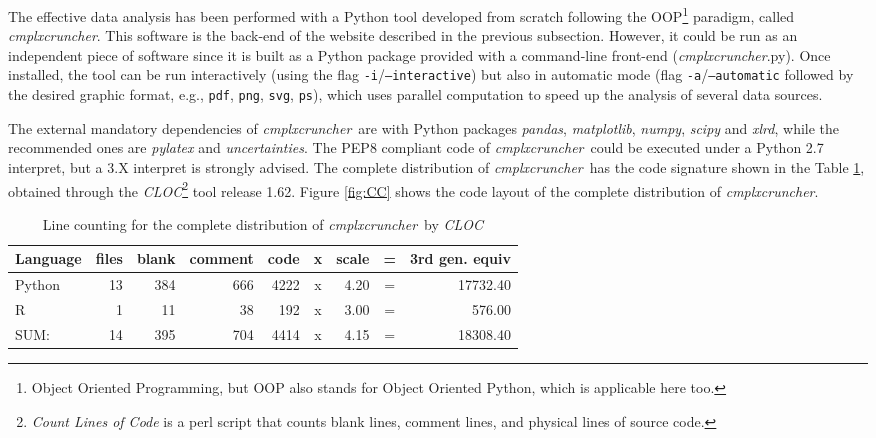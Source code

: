 \documentclass[12pt]{article}
\newcommand{\CC}[0]{\emph{cmplxcruncher}}
\begin{document}
The effective data analysis has been performed with a Python tool developed from scratch following the OOP\footnote{Object Oriented Programming, but OOP also stands for Object Oriented Python, which is applicable here too.} paradigm, called \CC. This software is the back-end of the website described in the previous subsection. However, it could be run as an independent piece of software since it is built as a Python package provided with a command-line front-end (\CC.py). Once installed, the tool can be run interactively (using the flag \texttt{-i}/\texttt{--interactive}) but also in automatic mode (flag \texttt{-a}/\texttt{--automatic} followed by the desired graphic format, e.g., \texttt{pdf}, \texttt{png}, \texttt{svg}, \texttt{ps}), which uses parallel computation to speed up the analysis of several data sources. 

The external mandatory dependencies of \CC\ are with Python packages \emph{pandas}, \emph{matplotlib}, \emph{numpy}, \emph{scipy} and \emph{xlrd}, while the recommended ones are \emph{pylatex} and \emph{uncertainties}. The PEP8 compliant code of \CC\ could be executed under a Python 2.7 interpret, but a 3.X interpret is strongly advised. The complete distribution of \CC\ has the code signature shown in the Table \ref{tab:cloc}, obtained through the \emph{CLOC}\footnote{\emph{Count Lines of Code} is a perl script that counts blank lines, comment lines, and physical lines of source code.} tool release 1.62. Figure \ref{fig:CC} shows the code layout of the complete distribution of \CC.

\begin{table}
  \begin{center}
    \begin{tabular}{lrrrrcrcr}
    \hline
	Language & files & blank & comment & code & x & scale & = & 3rd gen. equiv \\
	\hline
	Python & 13 & 384 & 666 & 4222 &x& 4.20 &=& 17732.40 \\
	R & 1 & 11 & 38 & 192 &x& 3.00 &=& 576.00 \\	
	\hline
	SUM: & 14 & 395 & 704 & 4414 &x& 4.15 &=& 18308.40 \\
	\hline
    \end{tabular}
  \end{center}
  \caption{Line counting for the complete distribution of \CC\ by \emph{CLOC}}
  \label{tab:cloc}
\end{table}
\end{document}
